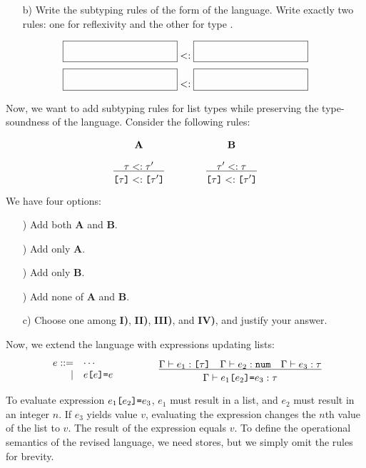 \begin{enumerate}
\begin{itemize}
\item[b)]
Write the subtyping rules of the form
\framebox{${\tau}<:{\tau}$} of the language.
Write exactly two rules: one for reflexivity and the other for type .
\end{itemize}

{
\[
{\sblank}<:{\sblank}
\]
\[
{\sblank}<:{\sblank}
\]
}

Now, we want to add subtyping rules for list types while preserving
the type-soundness of the language. Consider the following rules:

\[
\begin{array}{ccc}
\textbf{A} &\qquad& \textbf{B} \\[10pt]
\newinfrule
{ {\tau}<:{\tau'} }
{ {\code{[}\tau\code{]}}<:{\code{[}\tau'\code{]}} } &&
\newinfrule
{ {\tau'}<:{\tau} }
{ {\code{[}\tau\code{]}}<:{\code{[}\tau'\code{]}} }
\end{array}
\]

We have four options:
\begin{enumerate}
\item[\rom{1})] Add both \textbf{A} and \textbf{B}.
\item[\rom{2})] Add only \textbf{A}.
\item[\rom{3})] Add only \textbf{B}.
\item[\rom{4})] Add none of \textbf{A} and \textbf{B}.
\end{enumerate}

\begin{itemize}
\item[c)] Choose one among \textbf{I)}, \textbf{II)}, \textbf{III)}, and \textbf{IV)}, and justify your answer.
\end{itemize}

Now, we extend the language with expressions updating lists:
\[
\begin{array}{ccc}
\begin{array}{rl}
e ::= & \cdots \\
\mid& e\verb+[+e\verb+]=+e \\
\end{array} &\qquad&
\newinfrule
{ \typed{e_1}{\code{[}\tau\code{]}} \rulesep \typed{e_2}{\code{num}}
  \rulesep \typed{e_3}{\tau} }
{ \typed{e_1\code{[}e_2\code{]=}e_3}{\tau} }
\end{array}
\]

To evaluate expression $e_1\verb+[+e_2\verb+]=+e_3$, $e_1$ must result in a list,
and $e_2$ must result in an integer $n$. If $e_3$ yields value $v$, evaluating
the expression changes the $n$th value of the list to $v$. The result of the expression
equals $v$.
To define the operational semantics of the revised language, we need stores,
but we simply omit the rules for brevity.


\end{enumerate}
